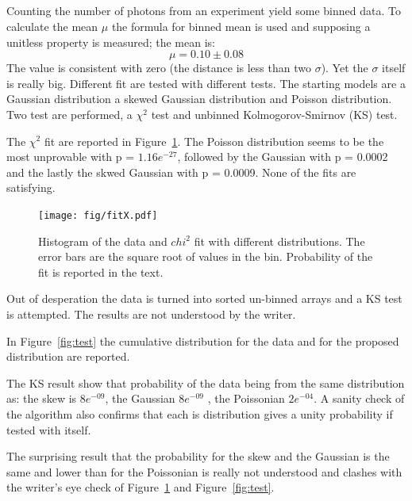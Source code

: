 \documentclass[twocolumn]{article}
\begin{document}
\subsection{}
Counting the number of photons from an experiment yield some binned data.
To calculate the mean $\mu$ the formula for binned mean is used and supposing  a unitless property is measured; the mean is:
\begin{equation}
	 \mu = 0.10 \pm 0.08
\end{equation}
The value is consistent with zero (the distance is less than two  $\sigma$). Yet the $\sigma$ itself is really big.
Different fit are tested with different tests. The starting models are a Gaussian distribution a skewed Gaussian distribution and Poisson distribution.
Two test are performed, a $\chi ^2 $ test and  unbinned Kolmogorov-Smirnov (KS) test.

The $\chi ^2 $ fit are reported in Figure~\ref{fig:fitX}. The Poisson distribution seems to be the most unprovable  with p = $1.16e^{-27}$, followed by the Gaussian with p = 0.0002 and the lastly the skwed Gaussian with p = 0.0009. None of the fits are satisfying.
\begin{figure}[h!]
	\begin{center}
		\texttt{[image: fig/fitX.pdf]}
	\end{center}
	\caption{Histogram of the data and $chi ^2 $ fit with different distributions. The error bars are the square root of values in the bin. Probability of the fit is reported in the text.}
	\label{fig:fitX}
\end{figure}

Out of desperation the data is turned into sorted un-binned arrays and a KS test is attempted.
The results are not understood by the writer.

In Figure~\ref{fig:test} the cumulative distribution for the data and for the proposed distribution are reported.

The KS result show that probability of the data  being from the same distribution as: the skew is $8e^{-09}$, the Gaussian  $8e^{-09}$ , the Poissonian $2e^{-04}$.
A sanity check of the algorithm also confirms that each is distribution gives a unity probability if tested with itself.

The surprising result that the probability for the skew and the Gaussian is the same and lower than for the Poissonian is really not understood and clashes with the writer's eye check of Figure~\ref{fig:fitX} and Figure~\ref{fig:test}.
\end{document}
